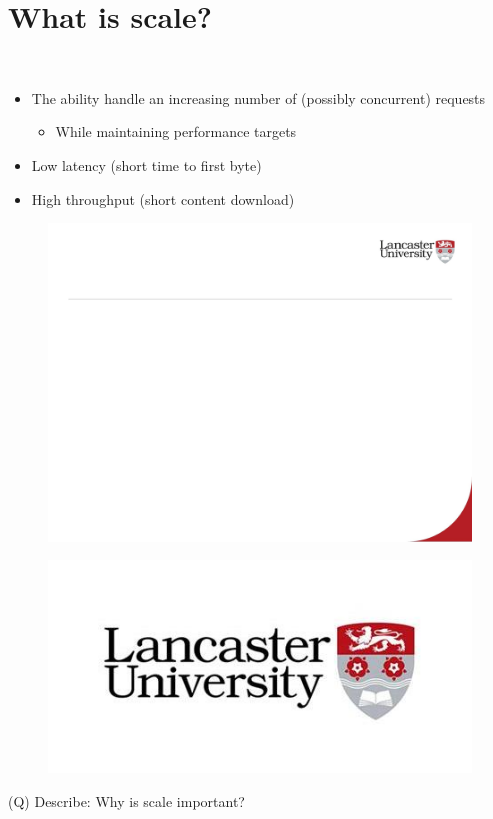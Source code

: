 \documentclass[12pt]{article}
\begin{document}
\section{What is scale?}
\\
\begin{itemize}
  \item The ability handle an increasing number of (possibly concurrent) requests
\begin{itemize}
  \item While maintaining performance targets
\end{itemize}
  \item Low latency (short time to first byte)
  \item High throughput (short content download)
\end{itemize}
\begin{figure}[H]
\includegraphics[width=0.5\linewidth]{page62-image-1.png}
\end{figure}
\begin{figure}[H]
\includegraphics[width=0.5\linewidth]{page62-image-2.png}
\end{figure}
\clearpage
(Q)
Describe: Why is scale important?
\clearpage
\end{document}

